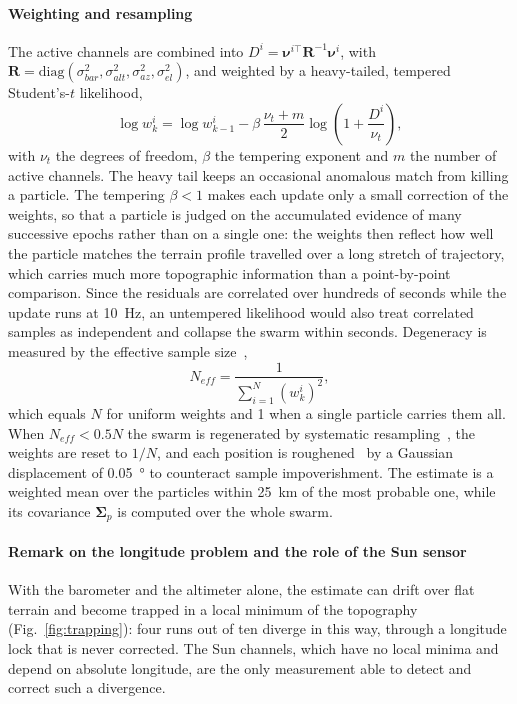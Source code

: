 \documentclass[preprint,12pt,a4paper]{elsarticle}
\begin{document}
\paragraph{Weighting and resampling}
The active channels are combined into
$D^i=\boldsymbol{\nu}^{i\top}\mathbf{R}^{-1}\boldsymbol{\nu}^i$, with
$\mathbf{R}=\mathrm{diag}(\sigma_{bar}^2,\sigma_{alt}^2,\sigma_{az}^2,\sigma_{el}^2)$, and
weighted by a heavy-tailed, tempered Student's-$t$ likelihood,
\begin{equation}
\log w_k^i=\log w_{k-1}^i-\beta\,\frac{\nu_t+m}{2}\log\left(1+\frac{D^i}{\nu_t}\right),
\end{equation}
with $\nu_t$ the degrees of freedom, $\beta$ the tempering exponent and $m$ the number of
active channels.
The heavy tail keeps an occasional anomalous match from killing a particle.
The tempering $\beta<1$ makes each update only a small correction of the weights, so that
a particle is judged on the accumulated evidence of many successive epochs rather than on a
single one: the weights then reflect how well the particle matches the terrain profile
travelled over a long stretch of trajectory, which carries much more topographic
information than a point-by-point comparison.
Since the residuals are correlated over hundreds of seconds while the update runs at
\SI{10}{Hz}, an untempered likelihood would also treat correlated samples as independent and
collapse the swarm within seconds.
Degeneracy is measured by the effective sample size~\cite{Kong1994,Arulampalam2002},
\begin{equation}
N_{eff}=\frac{1}{\sum_{i=1}^N(w_k^i)^2},
\end{equation}
which equals $N$ for uniform weights and 1 when a single particle carries them all.
When $N_{eff}<0.5N$ the swarm is regenerated by systematic resampling~\cite{Kitagawa1996},
the weights are reset to $1/N$, and each position is roughened~\cite{Gordon1993} by a
Gaussian displacement of \SI{0.05}{\degree} to counteract sample impoverishment.
The estimate is a weighted mean over the particles within \SI{25}{km} of the most probable
one, while its covariance $\boldsymbol{\Sigma}_p$ is computed over the whole swarm.

\paragraph{Remark on the longitude problem and the role of the Sun sensor}
With the barometer and the altimeter alone, the estimate can drift over flat terrain and
become trapped in a local minimum of the topography (Fig.~\ref{fig:trapping}): four runs out
of ten diverge in this way, through a longitude lock that is never corrected.
The Sun channels, which have no local minima and depend on absolute longitude, are the only
measurement able to detect and correct such a divergence.
\end{document}

